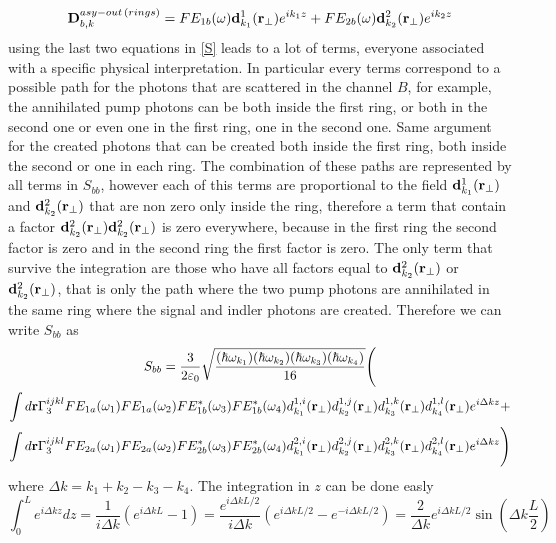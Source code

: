 \begin{equation}\mathbf{D}^{asy-out\,(rings)}_{b,k} = FE_{1b}(\omega) \mathbf{d}^1_{k_1}(\mathbf{r}_\perp)e^{ik_1z} + FE_{2b}(\omega)\mathbf{d}_{k_2}^2(\mathbf{r}_\perp)e^{ik_2z} \end{equation}
using the last two equations in \eqref{S} leads to a lot of terms, everyone associated with a specific physical interpretation. In particular every terms correspond to a possible path for the photons that are scattered in the channel $B$, for example, the annihilated pump photons can be both inside the first ring, or both in the second one or even one in the first ring, one in the second one. Same argument for the created photons that can be created both inside the first ring, both inside the second or one in each ring. The combination of these paths are represented by all terms in $S_{bb}$, however each of this terms are proportional to the field $\mathbf{d}^1_{k_1}(\mathbf{r}_{\perp})$ and $\mathbf{d}^2_{k_2}(\mathbf{r}_{\perp})$ that are non zero only inside the ring, therefore a term that contain a factor $\mathbf{d}^2_{k_2}(\mathbf{r}_{\perp})\mathbf{d}^2_{k_2}(\mathbf{r}_{\perp})$ is zero everywhere, because in the first ring the second factor is zero and in the second ring the first factor is zero. The only term that survive the integration are those who have all factors equal to  $\mathbf{d}^2_{k_2}(\mathbf{r}_{\perp})$ or $\mathbf{d}^2_{k_2}(\mathbf{r}_{\perp})$, that is only the path where the two pump photons are annihilated in the same ring where the signal and indler photons are created. Therefore we can write $S_{bb}$ as
\begin{multline}S_{bb} =\frac{3}{2\varepsilon_0}\sqrt{\frac{(\hbar\omega_{k_1})(\hbar\omega_{k_2})(\hbar\omega_{k_3})(\hbar\omega_{k_4})}{16}}\Bigg( \\ \int d\mathbf{r} \Gamma^{ijkl}_3FE_{1a}(\omega_1)FE_{1a}(\omega_2)FE^*_{1b}(\omega_3)FE^*_{1b}(\omega_4)d^{1,i}_{k_1}(\mathbf{r}_{\perp})d^{1,j}_{k_2}(\mathbf{r}_{\perp})d^{1,k}_{k_3}(\mathbf{r}_{\perp})d^{1,l}_{k_4}(\mathbf{r}_{\perp})e^{i\Delta k z} +\\
\int d\mathbf{r} \Gamma^{ijkl}_3FE_{2a}(\omega_1)FE_{2a}(\omega_2)FE^*_{2b}(\omega_3)FE^*_{2b}(\omega_4)d^{2,i}_{k_1}(\mathbf{r}_{\perp})d^{2,j}_{k_2}(\mathbf{r}_{\perp})d^{2,k}_{k_3}(\mathbf{r}_{\perp})d^{2,l}_{k_4}(\mathbf{r}_{\perp})e^{i\Delta k z}\Bigg)\end{multline}
where $\Delta k = k_1 + k_2 -k_3 - k_4$. The integration in $z$ can be done easly
\begin{equation}\int_0^{L} e^{i\Delta k z} dz = \frac{1}{i\Delta k}(e^{i\Delta k L} - 1) = \frac{e^{i\Delta k L/2}}{i\Delta k}(e^{i\Delta k L/2}- e^{-i\Delta k L/2}) = \frac{2}{\Delta k}e^{i\Delta k L/2} \sin\left(\Delta k \frac{L}{2}\right)\end{equation}
